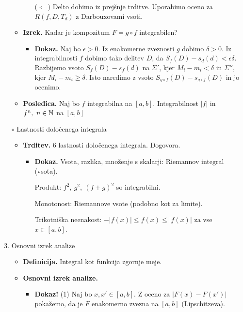 \begin{enumerate}
\begin{itemize}
\begin{itemize}
            ($\Leftarrow$) Delto dobimo iz prejšnje trditve. Uporabimo oceno za $R(f, D, T_d)$ z Darbouxovami vsoti.
        \end{itemize}
        \item \colorbox{blue!30}{\textbf{Izrek.}} Kadar je kompozitum $F = g \circ f$ integrabilen?
        \begin{itemize}
            \item \colorbox{green!30}{\textbf{Dokaz.}} Naj bo $\epsilon > 0$. Iz enakomerne zveznosti $g$ dobimo $\delta > 0$. Iz integrabilnosti $f$ dobimo tako delitev $D$, da $S_f(D) - s_d(d) < \epsilon \delta$. Razbijemo vsoto $S_f(D) - s_f(d)$ na $\Sigma'$, kjer $M_i - m_i < \delta$ in $\Sigma''$, kjer $M_i - m_i \geq \delta$. Isto naredimo z vsoto $S_{g \circ f}(D) - s_{g \circ f}(D)$ in jo ocenimo.
        \end{itemize}
        \item \colorbox{orange!30}{\textbf{Posledica.}} Naj bo $f$ integrabilna na $[a,b]$. Integrabilnost $|f|$ in $f^n, \ n \in \mathbb{N}$ na $[a,b]$
    \end{itemize}

    \item[$\circ$] Lastnosti določenega integrala
    \begin{itemize}
        \item \colorbox{blue!30}{\textbf{Trditev.}} 6 lastnosti določenega integrala. Dogovora.
        \begin{itemize}
            \item \colorbox{green!30}{\textbf{Dokaz.}} Vsota, razlika, množenje s skalarji: Riemannov integral (vsota).
            
            Produkt: $f^2, \ g^2, \ (f+g)^2$ so integrabilni.

            Monotonost: Riemannove vsote (podobno kot za limite).

            Trikotniška neenakost: $-|f(x)| \leq f(x) \leq |f(x)|$ za vse $x \in [a, b]$.
        \end{itemize}
    \end{itemize}

    \item Osnovni izrek analize
    \begin{itemize}
        \item \colorbox{purple!30}{\textbf{Definicija.}} Integral kot funkcija zgornje meje.
        \item \colorbox{blue!30}{\textbf{Osnovni izrek analize.}} 
        \begin{itemize}
            \item \colorbox{green!50}{\textbf{Dokaz!}} (1) Naj bo $x, x' \in [a,b]$. Z oceno za $|F(x) - F(x')|$ pokažemo, da je $F$ enakomerno zvezna na $[a,b]$ (Lipschitzeva).
            

\end{itemize}
\end{itemize}
\end{enumerate}
